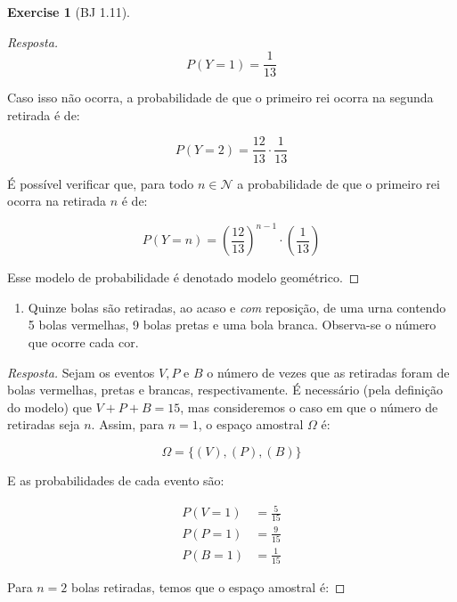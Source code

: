 \documentclass[
]{article}
\providecommand{\tightlist}{%
  \setlength{\itemsep}{0pt}\setlength{\parskip}{0pt}}
\theoremstyle{definition}
\theoremstyle{definition}
\theoremstyle{definition}
\newtheorem{exercise}{Exercise}[section]
\theoremstyle{definition}
\theoremstyle{remark}
\begin{document}
\begin{exercise}[BJ 1.11]
\begin{proof}[Resposta]
\begin{equation*}
P(Y = 1) = \frac{1}{13}
\end{equation*}

Caso isso não ocorra, a probabilidade de que o primeiro rei ocorra na segunda retirada é de:

\begin{equation*}
P(Y = 2) = \frac{12}{13} \cdot \frac{1}{13}
\end{equation*}

É possível verificar que, para todo \(n \in \mathcal{N}\) a probabilidade de que o primeiro rei ocorra na retirada \(n\) é de:

\begin{equation*}
P(Y = n) = \left(\frac{12}{13}\right)^{n-1} \cdot \left(\frac{1}{13}\right)
\end{equation*}

Esse modelo de probabilidade é denotado modelo geométrico.
\end{proof}

\begin{enumerate}
\def\labelenumi{\alph{enumi})}
\setcounter{enumi}{2}
\tightlist
\item
  Quinze bolas são retiradas, ao acaso e \emph{com} reposição, de uma urna contendo 5 bolas vermelhas, 9 bolas pretas e uma bola branca. Observa-se o número que ocorre cada cor.
\end{enumerate}

\begin{proof}[Resposta]
Sejam os eventos \(V, P \text{ e } B\) o número de vezes que as retiradas foram de bolas vermelhas, pretas e brancas, respectivamente. É necessário (pela definição do modelo) que \(V + P + B = 15\), mas consideremos o caso em que o número de retiradas seja \(n\). Assim, para \(n = 1\), o espaço amostral \(\Omega\) é:

\begin{equation*}
\Omega = \{(V),(P),(B)\}
\end{equation*}

E as probabilidades de cada evento são:

\begin{align*}
P(V = 1) &= \frac{5}{15} \\
P(P = 1) &= \frac{9}{15} \\
P(B = 1) &= \frac{1}{15}
\end{align*}

Para \(n=2\) bolas retiradas, temos que o espaço amostral é:


\end{proof}
\end{exercise}
\end{document}
